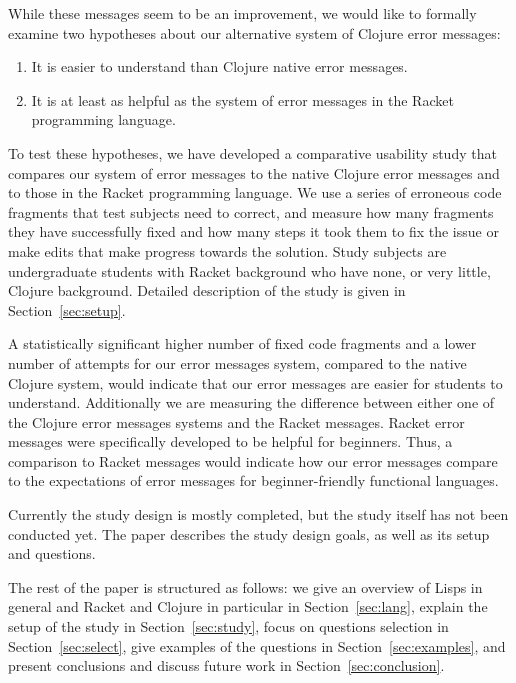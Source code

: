 \documentclass[12pt]{article}
\newcommand{\comment}[1]{{\bf \tt  {#1}}}
\newcommand{\emcomment}[1]{\textcolor{ForestGreen}{\comment{Elena: {#1}}}}
\begin{document}
While these messages seem to be an improvement, we would like to formally examine two hypotheses about our alternative system of Clojure error messages:
\begin{enumerate}
\item It is easier to understand than Clojure native error messages.
\item It is at least as helpful as the system of error messages in the Racket programming language.
\end{enumerate}
To test these hypotheses, we have developed a comparative usability study that compares our system of error messages to the native Clojure error messages and to those in the Racket programming language. We use a series of erroneous code fragments that test subjects need to correct, and measure how many fragments they have successfully fixed and how many steps it took them to fix the issue or make edits that make progress towards the solution. 
Study subjects are undergraduate students with Racket background who have none, or very little, Clojure background. 
Detailed description of the study is given in Section~\ref{sec:setup}. 

A statistically significant higher number of fixed code fragments and a lower number of attempts for our error messages system, compared to the native Clojure system, would indicate that our error messages are easier for students to understand. Additionally we are measuring the difference between either one of the Clojure error messages systems and the Racket messages. Racket error messages were specifically developed to be helpful for beginners. Thus, a comparison to Racket messages would indicate how our error messages compare to the expectations of error messages for beginner-friendly functional languages. 

Currently the study design is mostly completed, but the study itself has not been conducted yet. The paper describes the study design goals, as well as its setup and questions. 

The rest of the paper is structured as follows: we give an overview of Lisps in general and Racket and Clojure in particular in Section~\ref{sec:lang}, explain the setup of the study in Section~\ref{sec:study}, focus on questions selection in Section~\ref{sec:select}, give examples of the questions in Section~\ref{sec:examples}, and present conclusions and discuss future work in Section~\ref{sec:conclusion}.
\end{document}
